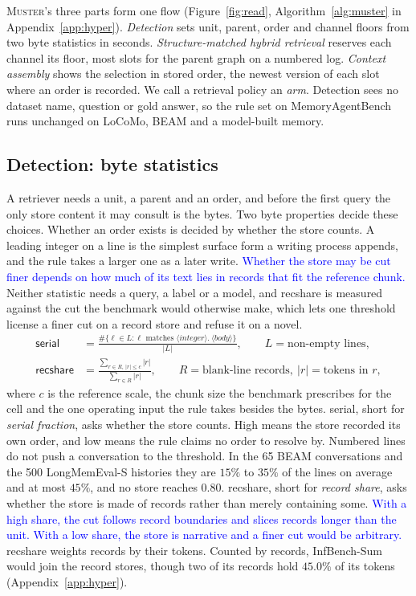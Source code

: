 \documentclass{article}
\newcommand{\nativechange}[1]{\textcolor{blue}{#1}}
\newcommand{\sys}{\textsc{Muster}}
\newcommand{\serial}{\textsf{serial}}
\newcommand{\cov}{\textsf{recshare}}
\begin{document}
\sys{}'s three parts form one flow (Figure~\ref{fig:read}, Algorithm~\ref{alg:muster} in Appendix~\ref{app:hyper}). \emph{Detection} sets unit, parent, order and channel floors from two byte statistics in seconds. \emph{Structure-matched hybrid retrieval} reserves each channel its floor, most slots for the parent graph on a numbered log. \emph{Context assembly} shows the selection in stored order, the newest version of each slot where an order is recorded. We call a retrieval policy an \emph{arm}. Detection sees no dataset name, question or gold answer, so the rule set on MemoryAgentBench runs unchanged on LoCoMo, BEAM and a model-built memory.

\subsection{Detection: byte statistics}\label{sec:stats}

A retriever needs a unit, a parent and an order, and before the first query the only store content it may consult is the bytes. Two byte properties decide these choices. Whether an order exists is decided by whether the store counts. A leading integer on a line is the simplest surface form a writing process appends, and the rule takes a larger one as a later write. \nativechange{Whether the store may be cut finer depends on how much of its text lies in records that fit the reference chunk.} Neither statistic needs a query, a label or a model, and \cov{} is measured against the cut the benchmark would otherwise make, which lets one threshold license a finer cut on a record store and refuse it on a novel.
\begin{align}
\serial &= \frac{\#\{\ell \in L : \ell \text{ matches } \langle\textit{integer}\rangle\texttt{.}\ \langle\textit{body}\rangle\}}{|L|},
\qquad L = \text{non-empty lines}, \\
\cov &= \frac{\sum_{r \in R,\, |r| \le c} |r|}{\sum_{r \in R} |r|},
\qquad R = \text{blank-line records},\ |r| = \text{tokens in } r,
\end{align}
where $c$ is the reference scale, the chunk size the benchmark prescribes for the cell and the one operating
input the rule takes besides the bytes.
\serial{}, short for \emph{serial fraction}, asks whether the store counts. High means the store recorded its own order, and low means the rule claims no order to resolve by. Numbered lines do not push a conversation to the threshold. In the 65 BEAM conversations and the 500 LongMemEval-S histories \cite{longmemeval} they are $15\%$ to $35\%$ of the lines on average and at most $45\%$, and no store reaches $0.80$. \cov{}, short for \emph{record share}, asks whether the store is made of
records rather than merely containing some. \nativechange{With a high share, the cut follows record boundaries and slices records longer than the unit.
With a low share, the store is narrative and a finer cut would be arbitrary.} \cov{} weights records by their tokens. Counted by records, InfBench-Sum would join the record stores, though two of its records hold $45.0\%$ of its tokens (Appendix~\ref{app:hyper}).
\end{document}
